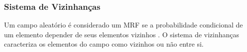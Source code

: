 






\subsubsection{Sistema de Vizinhanças}

Um campo aleatório é considerado um MRF se a probabilidade condicional de um elemento depender de seus elementos vizinhos \cite{vizinh00}. O sistema de vizinhanças caracteriza os elementos do campo como vizinhos ou não entre si.



